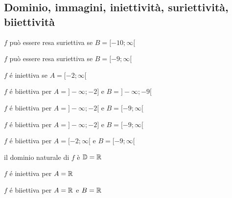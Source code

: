 \subsection{Dominio, immagini, iniettività, suriettività, biiettività}

\begin{questions}


    \begin{qblock}
        \question

        \begin{checkboxes}

            \choice $f$ può essere resa suriettiva se $B=[-10;\infty[$

            \CorrectChoice $f$ può essere resa suriettiva se $B=[-9;\infty[$

            \CorrectChoice $f$ é iniettiva se $A=[-2;\infty[$

            \choice $f$ é biiettiva per $A=]-\infty;-2]$ e $B=]-\infty;-9[$

            \choice $f$ é biiettiva per $A=]-\infty;-2[$ e $B=[-9;\infty[$

            \CorrectChoice $f$ é biiettiva per $A=]-\infty;-2]$ e $B=[-9;\infty[$


            \CorrectChoice $f$ é biiettiva per $A=[-2;\infty[$ e $B=[-9;\infty[$

            \CorrectChoice il dominio naturale di $f$ è $\mathbb{D}=\mathbb{R}$

            \choice $f$ é iniettiva per $A=\mathbb{R}$

            \choice $f$ é biiettiva per $A=\mathbb{R}$ e $B=\mathbb{R}$

        \end{checkboxes}
    \end{qblock}


    \begin{qblock}
        \question

        \begin{checkboxes}


\end{checkboxes}
\end{qblock}
\end{questions}
